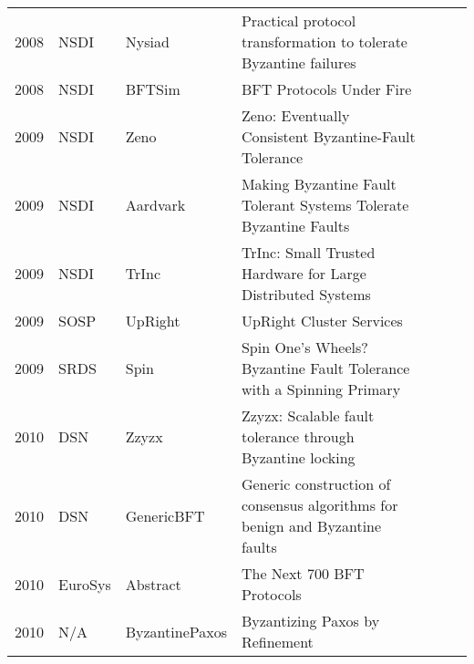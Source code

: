 \documentclass{article}
\begin{document}
\begin{landscape}
\begin{table}[]
{\begin{tabular}{llll|l|l|l|}
2008 & NSDI              & Nysiad                  & Practical protocol transformation to tolerate Byzantine failures                          &            &          &              \\ \cline{5-7} 
2008 & NSDI              & BFTSim                  & BFT Protocols Under Fire                                                                  &            &          &              \\ \cline{5-7} 
2009 & NSDI              & Zeno                    & Zeno: Eventually Consistent Byzantine-Fault Tolerance                                     &            &          &              \\ \cline{5-7} 
2009 & NSDI              & Aardvark                & Making Byzantine Fault Tolerant Systems Tolerate Byzantine Faults                         &            &          &              \\ \cline{5-7} 
2009 & NSDI              & TrInc                   & TrInc: Small Trusted Hardware for Large Distributed Systems                               &            &          &              \\ \cline{5-7} 
2009 & SOSP              & UpRight                 & UpRight Cluster Services                                                                  &            &          &              \\ \cline{5-7} 
2009 & SRDS              & Spin                    & Spin One’s Wheels? Byzantine Fault Tolerance with a Spinning Primary                      &            &          &              \\ \cline{5-7} 
2010 & DSN               & Zzyzx                   & Zzyzx: Scalable fault tolerance through Byzantine locking                                 &            &          &              \\ \cline{5-7} 
2010 & DSN               & GenericBFT              & Generic construction of consensus algorithms for benign and Byzantine faults              &            &          &              \\ \cline{5-7} 
2010 & EuroSys           & Abstract                & The Next 700 BFT Protocols                                                                &            &          &              \\ \cline{5-7} 
2010 & N/A               & ByzantinePaxos          & Byzantizing Paxos by Refinement                                                           &            &          &              \\ \cline{5-7} 

\end{tabular}}
\end{table}
\end{landscape}
\end{document}
